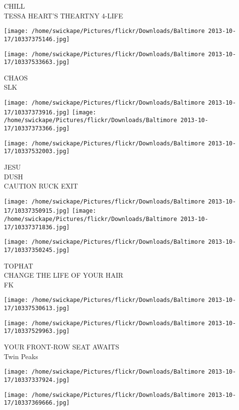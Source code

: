 \documentclass[10pt,letterpaper]{article}
\begin{document}
CHILL\\
TESSA HEART'S THEARTNY 4{-}LIFE
\pagebreak

\texttt{[image: /home/swickape/Pictures/flickr/Downloads/Baltimore 2013-10-17/10337375146.jpg]}

\vspace{0.25in}
\texttt{[image: /home/swickape/Pictures/flickr/Downloads/Baltimore 2013-10-17/10337533663.jpg]}

CHAOS\\
SLK
\pagebreak

\texttt{[image: /home/swickape/Pictures/flickr/Downloads/Baltimore 2013-10-17/10337373916.jpg]}
\texttt{[image: /home/swickape/Pictures/flickr/Downloads/Baltimore 2013-10-17/10337373366.jpg]}

\vspace{0.25in}
\texttt{[image: /home/swickape/Pictures/flickr/Downloads/Baltimore 2013-10-17/10337532003.jpg]}

JESU\\
DUSH\\
CAUTION RUCK EXIT
\pagebreak

\texttt{[image: /home/swickape/Pictures/flickr/Downloads/Baltimore 2013-10-17/10337350915.jpg]}
\texttt{[image: /home/swickape/Pictures/flickr/Downloads/Baltimore 2013-10-17/10337371836.jpg]}

\texttt{[image: /home/swickape/Pictures/flickr/Downloads/Baltimore 2013-10-17/10337350245.jpg]}

TOPHAT\\
CHANGE THE LIFE OF YOUR HAIR\\
FK
\pagebreak

\texttt{[image: /home/swickape/Pictures/flickr/Downloads/Baltimore 2013-10-17/10337530613.jpg]}

\vspace{0.25in}
\texttt{[image: /home/swickape/Pictures/flickr/Downloads/Baltimore 2013-10-17/10337529963.jpg]}

YOUR FRONT{-}ROW SEAT AWAITS\\
Twin Peaks
\pagebreak

\texttt{[image: /home/swickape/Pictures/flickr/Downloads/Baltimore 2013-10-17/10337337924.jpg]}

\vspace{0.25in}
\texttt{[image: /home/swickape/Pictures/flickr/Downloads/Baltimore 2013-10-17/10337369666.jpg]}
\end{document}
